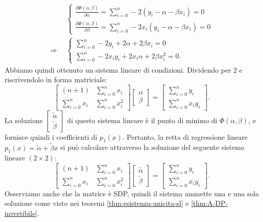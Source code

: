 \begin{equation*}
\begin{aligned}
 & \begin{cases}
\displaystyle\frac{\partial \Phi ( \alpha ,\beta )}{\partial \alpha } =\sum ^{n}_{i=0} -2( y_{i} -\alpha -\beta x_{i}) =0\\
\displaystyle\frac{\partial \Phi ( \alpha ,\beta )}{\partial \beta } =\sum ^{n}_{i=0} -2x_{i}( y_{i} -\alpha -\beta x_{i}) =0
\end{cases}\\
\Rightarrow \ \ & \begin{cases}
\displaystyle\sum ^{n}_{i=0} -2y_{i} +2\alpha +2\beta x_{i} =0\\
\displaystyle\sum ^{n}_{i=0} -2x_{i} y_{i} +2x_{i} \alpha +2\beta x^{2}_{i} =0.
\end{cases}
\end{aligned}
\end{equation*}
Abbiamo quindi ottenuto un sistema lineare di condizioni. Dividendo per $2$ e riscrivendolo in forma matriciale:
\begin{equation*}
\begin{bmatrix}
\displaystyle( n+1) & \displaystyle\sum ^{n}_{i=0} x_{i}\\
\displaystyle\sum ^{n}_{i=0} x_{i} & \displaystyle\sum ^{n}_{i=0} x^{2}_{i}
\end{bmatrix}\begin{bmatrix}
\alpha \\
\beta
\end{bmatrix} =\begin{bmatrix}
\displaystyle\sum ^{n}_{i=0} y_{i}\\
\displaystyle\sum ^{n}_{i=0} x_{i} y_{i}
\end{bmatrix}.
\end{equation*}
La soluzione $\begin{bmatrix}
\tilde{\alpha }\\
\tilde{\beta }
\end{bmatrix}$ di questo sistema lineare è il punto di minimo di $\Phi ( \alpha ,\beta )$, e fornisce quindi i coefficienti di $p_{1}(x)$. Pertanto, la retta di regressione lineare $p_{1}(x) =\tilde{\alpha } +\tilde{\beta } x$ si può calcolare attraverso la soluzione del seguente sistema lineare $( 2\times 2)$:
\begin{equation*}
\begin{bmatrix}
( n+1) & \displaystyle\sum ^{n}_{i=0} x_{i}\\
\displaystyle\sum ^{n}_{i=0} x_{i} & \displaystyle\sum ^{n}_{i=0} x^{2}_{i}
\end{bmatrix}\begin{bmatrix}
\tilde{\alpha }\\
\tilde{\beta }
\end{bmatrix} =\begin{bmatrix}
\displaystyle\sum ^{n}_{i=0} y_{i}\\
\displaystyle\sum ^{n}_{i=0} x_{i} y_{i}
\end{bmatrix}.
\end{equation*}
Osserviamo anche che la matrice è SDP, quindi il sistema ammette una e una sola soluzione come visto nei teoremi \ref{thm:esistenza-unicita-sl} e \ref{thm:A-DP-invertibile}.

